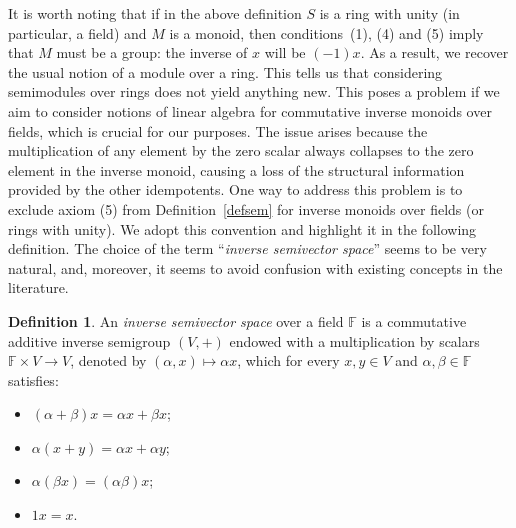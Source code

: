 \documentclass[10pt,a4paper]{amsart}
\theoremstyle{definition}
\newtheorem{defn}[thm]{Definition}
\theoremstyle{remark}
\numberwithin{equation}{section}
\newtheorem*{Theorem A}{\textbf{Theorem A}}
\newtheorem*{Corollary E}{\textbf{Corollary E}}
\newtheorem*{Corollary F}{\textbf{Corollary F}}
\newtheorem*{Theorem B}{\textbf{Theorem B}}
\newtheorem*{Theorem C}{\textbf{Theorem C}}
\newtheorem*{Theorem D}{\textbf{Theorem B}}
\newtheorem*{p a}{\textbf{Proof of  Theorem A}}
\newtheorem*{p b}{\textbf{Proof of Theorem B}}
\newtheorem*{p c}{\textbf{Proof of  Theorem C}}
\newtheorem*{p d}{\textbf{Proof of  Theorem D}}
\newcommand{\F}{\mathbb{F}}
\newcommand{\0}{{\vartheta}}
\begin{document}
It is worth noting that if in the  above definition  $S$ is a ring with unity (in particular,  a field) and $M$ is a monoid, then conditions~(1), (4) and (5) imply that $M$ must be a group: the inverse of $x$ will be  $(-1)x$. As a result, we recover the usual notion of a module over a ring. This tells us that considering semimodules over rings does not yield anything new. This poses a problem if we aim to consider notions of linear algebra for commutative inverse monoids over fields, which is crucial for our purposes. The issue arises because the multiplication of any element by the zero scalar always collapses to the zero element in the inverse monoid, causing a loss of the structural information provided by the other idempotents. One way to address this problem is to exclude axiom (5) from Definition~\ref{defsem} for inverse monoids over fields (or rings with unity). We adopt this convention and highlight it in the following definition.  The choice of the term  ``{\em inverse semivector space}'' seems to be very natural, and, moreover, it seems to avoid confusion with existing concepts in the literature.

\begin{defn}\label{def2}
An {\em inverse semivector space} over a field $\F$  is a commutative additive inverse semigroup $(V,+)$ endowed with a multiplication by scalars $\mathbb{F} \times V \rightarrow V$, denoted by $(\alpha,x)\mapsto \alpha x$, which for every $x,y\in V$ and $\alpha,\beta\in \F$ satisfies:
\begin{itemize}
       \item[$(1)$]$(\alpha+\beta)x=\alpha x+\beta x$; 
        \item[$(2)$]$\alpha (x+y)=\alpha x+\alpha y$;
         \item[$(3)$]$\alpha (\beta x)=(\alpha \beta)x$;
          \item[$(4)$]$1x=x.$
   \end{itemize}
\end{defn}

\end{document}

